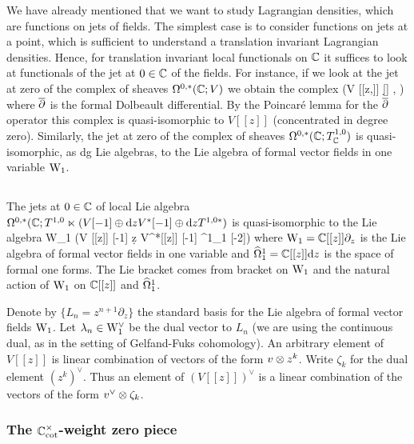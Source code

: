 We have already mentioned that we want to study Lagrangian densities, which are functions on jets of fields. 
The simplest case is to consider functions on jets at a point, which is sufficient to understand a translation invariant Lagrangian densities. 
Hence, for translation invariant local functionals on $\mathbb C$ it suffices to look at functionals of the jet at $0 \in \mathbb C$ of the fields. 
For instance, if we look at the jet at zero of the complex of sheaves $\Omega^{0,*}(\mathbb C ; V)$ we obtain the complex
\ben
(V [[z,\zbar]] [\d \zbar] , \dbar)
\een
where $\overline{\partial}$ is the formal Dolbeault differential. 
By the Poincar\'{e} lemma for the $\overline{\partial}$ operator this complex is quasi-isomorphic to $V[[z]]$ (concentrated in degree zero). 
Similarly, the jet at zero of the complex of sheaves $\Omega^{0,*}(\mathbb C ; T^{1,0}_\mathbb C)$ is quasi-isomorphic, as dg Lie algebras, to the Lie algebra of formal vector fields in one variable ${\rm W}_1$.

\subsection{}

The jets at $0 \in \mathbb C$ of local Lie algebra $\Omega^{0,*}(\mathbb C ; T^{1,0} \ltimes (V[-1] \oplus {\rm d} z V^*[-1] \oplus {\rm d} z T^{1,0 *})$ is quasi-isomorphic to the Lie algebra
\be\label{jet lie}
{\rm W}_1 \ltimes (V [[z]] [-1] \oplus \d z V^*[[z]] [-1] \oplus \hOmega^1_1 [-2])
\ee
where ${\rm W}_1 = \mathbb C [[z]] \partial_z$ is the Lie algebra of formal vector fields in one variable and $\widehat{\Omega}^1_1 = \mathbb C [[z]] {\rm d} z$ is the space of formal one forms. 
The Lie bracket comes from bracket on ${\rm W}_1$ and the natural action of ${\rm W}_1$ on $\mathbb C [[z]]$ and $\widehat{\Omega}^1_1$. 

Denote by $\{L_n = z^{n+1} \partial_z\}$ the standard basis for the Lie algebra of formal vector fields ${\rm W}_1$. 
Let $\lambda_n \in {\rm W}_1^\vee$ be the dual vector to $L_n$ (we are using the continuous dual, as in the setting of Gelfand-Fuks cohomology). 
An arbitrary element of $V [[z]]$ is linear combination of vectors of the form $v \otimes z^k$. 
Write $\zeta_k$ for the dual element $(z^k)^\vee$. 
Thus an element of $(V [[z]])^\vee$ is a linear combination of the vectors of the form $v^\vee \otimes \zeta_k$. 

\subsubsection{The $\mathbb C^\times_{\rm cot}$-weight zero piece}

